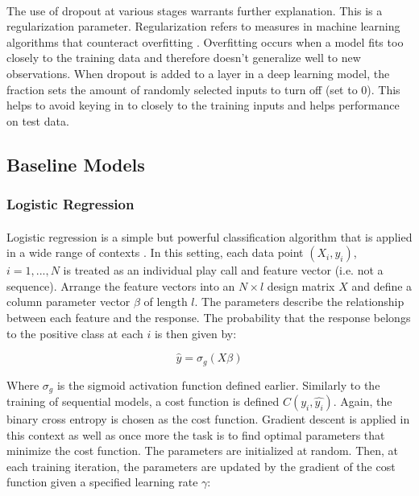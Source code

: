 \documentclass[11pt]{article}
\begin{document}
                    \begin{multicols*}{2}

                    \paragraph{}
                        The use of dropout at various stages warrants further explanation. 
                        This is a regularization parameter. 
                        Regularization refers to measures in machine learning algorithms that counteract overfitting \cite{Hastie01}.
                        Overfitting occurs when a model fits too closely to the training data and therefore doesn't generalize well to new observations.
                        When dropout is added to a layer in a deep learning model, the fraction sets the amount of randomly selected inputs to turn off (set to 0). 
                        This helps to avoid keying in to closely to the training inputs and helps performance on test data. 

        \subsection{Baseline Models}

            \subsubsection*{Logistic Regression}
                \paragraph{}
                    Logistic regression is a simple but powerful classification algorithm that is applied in a wide range of contexts \cite{Hastie01}.
                    In this setting, each data point $(X_i,y_i)$, $i = 1,...,N$ is treated as an individual play call and feature vector (i.e. not a sequence).
                    Arrange the feature vectors into an $N \times l$ design matrix $X$ and define a column parameter vector $\beta$ of length $l$.
                    The parameters describe the relationship between each feature and the response.
                    The probability that the response belongs to the positive class at each $i$ is then given by:
                    
                    $$\hat{y} = \sigma_g(X\beta)$$

                    Where $\sigma_g$ is the sigmoid activation function defined earlier. 
                    Similarly to the training of sequential models, a cost function is defined $C(y_i, \hat{y_i})$.
                    Again, the binary cross entropy is chosen as the cost function. 
                    Gradient descent is applied in this context as well as once more the task is to find optimal parameters that minimize the cost function.
                    The parameters are initialized at random.
                    Then, at each training iteration, the parameters are updated by the gradient of the cost function given a specified learning rate $\gamma$:


\end{multicols*}
\end{document}
